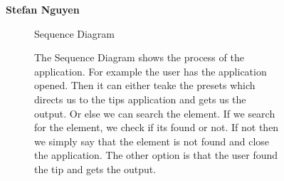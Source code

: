 \documentclass{article}
\begin{document}
	\begin{figure}[htbp]
		\textbf{Stefan Nguyen}
		\centering
		\begin{subfigure}{\textwidth}
			\resizebox{\textwidth}{!}{}
			\caption{Sequence Diagram}
		\end{subfigure}
		\begin{subfigure}{\textwidth}
			The Sequence Diagram shows the process of the application. For example the user has the application opened. Then it can
			either teake the presets which directs us to the tips application and gets us the output. Or else we can search the element. 
			If we search for the element, we check if its found or not. If not then we simply say that the element is not found and close the application. 
			The other option is that the user found the tip and gets the output. 
		\end{subfigure}
	\end{figure}
	\newpage
\end{document}
